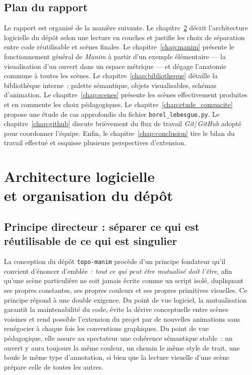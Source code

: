 \documentclass[12pt, a4paper, openany]{report}
\begin{document}
	\section{Plan du rapport}

	Le rapport est organisé de la manière suivante. Le chapitre~\ref{chap:architecture} décrit l’architecture logicielle du dépôt selon une lecture en couches et justifie les choix de séparation entre code réutilisable et scènes finales. Le chapitre~\ref{chap:manim} présente le fonctionnement général de \textit{Manim} à partir d’un exemple élémentaire — la visualisation d’un ouvert dans un espace métrique — et dégage l’anatomie commune à toutes les scènes. Le chapitre~\ref{chap:bibliotheque} détaille la bibliothèque interne~: palette sémantique, objets visualisables, schémas d’animation. Le chapitre~\ref{chap:scenes} présente les scènes effectivement produites et en commente les choix pédagogiques. Le chapitre~\ref{chap:etude_compacite} propose une étude de cas approfondie du fichier \texttt{borel\_lebesgue.py}. Le chapitre~\ref{chap:github} discute brièvement du flux de travail \textit{Git}/\textit{GitHub} adopté pour coordonner l’équipe. Enfin, le chapitre~\ref{chap:conclusion} tire le bilan du travail effectué et esquisse plusieurs perspectives d’extension.
	
	\chapter[Architecture du projet]{Architecture logicielle\\et organisation du dépôt}\label{chap:architecture}

	\section{Principe directeur : séparer ce qui est réutilisable de ce qui est singulier}

	La conception du dépôt \texttt{topo-manim} procède d’un principe fondateur qu’il convient d’énoncer d’emblée~: \emph{tout ce qui peut être mutualisé doit l’être}, afin qu’une scène particulière ne soit jamais écrite comme un script isolé, dupliquant ses propres constantes, ses propres couleurs et ses propres primitives visuelles. Ce principe répond à une double exigence. Du point de vue logiciel, la mutualisation garantit la maintenabilité du code, évite la dérive conceptuelle entre scènes voisines et rend possible l’extension du projet par de nouvelles animations sans renégocier à chaque fois les conventions graphiques. Du point de vue pédagogique, elle assure au spectateur une cohérence sémantique stable~: un ouvert y aura toujours la même couleur, un chemin le même style de trait, une boule le même type d’annotation, si bien que la lecture visuelle d’une scène prépare celle de toutes les autres.
\end{document}
